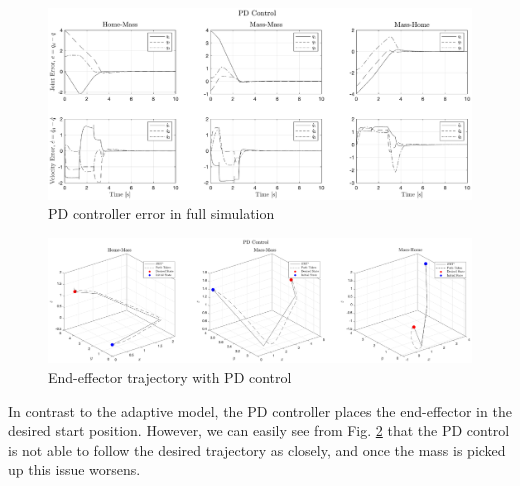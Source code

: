 \begin{figure}[H]
	\centering
	\includegraphics[width=\textwidth]{figures/mass10NNerrPD.eps}
	\caption{PD controller error in full simulation}
	\label{fig:nnerrpd}
\end{figure}
\begin{figure}[H]
	\centering
	\includegraphics[width=\textwidth]{figures/mass10NNeetrajPD.eps}
	\caption{End-effector trajectory with PD control}
	\label{fig:nntrajpd}
\end{figure}
In contrast to the adaptive model, the PD controller places the end-effector in the desired start position. However, we can easily see from Fig. \ref{fig:nntrajpd} that the PD control is not able to follow the desired trajectory as closely, and once the mass is picked up this issue worsens.